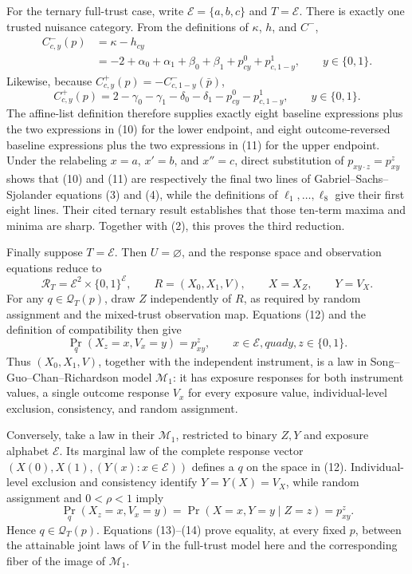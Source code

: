 For the ternary full-trust case, write \(\mathcal E=\{a,b,c\}\) and \(T=\mathcal E\).  There is exactly one trusted nuisance category.  From the definitions of \(\kappa\), \(h\), and \(C^-\),
\[
 \begin{aligned}
 C^-_{c,y}(p)
 &=\kappa-h_{cy}\\
 &=-2+\alpha_0+\alpha_1+\beta_0+\beta_1
      +p^0_{cy}+p^1_{c,1-y},
 \qquad y\in\{0,1\}.
 \end{aligned}
 \tag{10}
\]
Likewise, because \(C^+_{c,y}(p)=-C^-_{c,1-y}(\bar p)\),
\[
 C^+_{c,y}(p)
 =2-\gamma_0-\gamma_1-\delta_0-\delta_1
     -p^0_{cy}-p^1_{c,1-y},
 \qquad y\in\{0,1\}.
 \tag{11}
\]
The affine-list definition therefore supplies exactly eight baseline expressions plus the two expressions in (10) for the lower endpoint, and eight outcome-reversed baseline expressions plus the two expressions in (11) for the upper endpoint.  Under the relabeling \(x=a\), \(x'=b\), and \(x''=c\), direct substitution of \(p_{xy\cdot z}=p^z_{xy}\) shows that (10) and (11) are respectively the final two lines of Gabriel--Sachs--Sjolander equations (3) and (4), while the definitions of \(\ell_1,\ldots,\ell_8\) give their first eight lines.  Their cited ternary result establishes that those ten-term maxima and minima are sharp.  Together with (2), this proves the third reduction.

Finally suppose \(T=\mathcal E\).  Then \(U=\varnothing\), and the response space and observation equations reduce to
\[
 \mathcal R_T=\mathcal E^2\times\{0,1\}^{\mathcal E},
 \qquad R=(X_0,X_1,V),
 \qquad X=X_Z,
 \qquad Y=V_X.
 \tag{12}
\]
For any \(q\in\mathcal Q_T(p)\), draw \(Z\) independently of \(R\), as required by random assignment and the mixed-trust observation map.  Equations (12) and the definition of compatibility then give
\[
 \Pr_q(X_z=x,V_x=y)=p^z_{xy},
 \qquad x\in\mathcal E,quad y,z\in\{0,1\}.
 \tag{13}
\]
Thus \((X_0,X_1,V)\), together with the independent instrument, is a law in Song--Guo--Chan--Richardson model \(\mathcal M_1\): it has exposure responses for both instrument values, a single outcome response \(V_x\) for every exposure value, individual-level exclusion, consistency, and random assignment.

Conversely, take a law in their \(\mathcal M_1\), restricted to binary \(Z,Y\) and exposure alphabet \(\mathcal E\).  Its marginal law of the complete response vector \((X(0),X(1),(Y(x):x\in\mathcal E))\) defines a \(q\) on the space in (12).  Individual-level exclusion and consistency identify \(Y=Y(X)=V_X\), while random assignment and \(0<\rho<1\) imply
\[
 \Pr_q(X_z=x,V_x=y)
 =\Pr(X=x,Y=y\mid Z=z)
 =p^z_{xy}.
 \tag{14}
\]
Hence \(q\in\mathcal Q_T(p)\).  Equations (13)--(14) prove equality, at every fixed \(p\), between the attainable joint laws of \(V\) in the full-trust model here and the corresponding fiber of the image of \(\mathcal M_1\).

